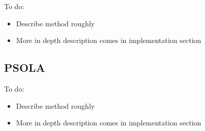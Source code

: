 \color{red}
To do:
\begin{itemize}
	\item Describe method roughly
	\item More in depth description comes in implementation section
\end{itemize}
\color{black}

\subsection{PSOLA}

\color{red}
To do:
\begin{itemize}
	\item Describe method roughly
	\item More in depth description comes in implementation section
\end{itemize}
\color{black}
